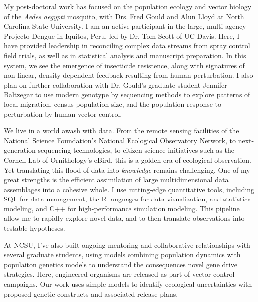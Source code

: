 \documentclass[12pt]{article}
\begin{document}
My post-doctoral work has focused on the 
population ecology and vector biology of the 
{\em Aedes aegypti} mosquito,
with Drs. Fred Gould and Alun Lloyd at 
North Carolina State University. I am an
active participant in the large, multi-agency
Projecto Dengue in Iquitos, Peru, led by Dr.
Tom Scott of UC Davis. Here, I 
have provided leadership in reconciling complex data 
streams from spray control field trials, as well as
in statistical analysis and manuscript preparation.
In this system, we see the emergence 
of insecticide resistence, along with signatures of  
non-linear, density-dependent feedback resulting 
from human perturbation. I also plan on further  
collaboration with Dr. Gould's graduate student 
Jennifer Baltzegar to use modern genotype by 
sequencing methods to explore patterns of local 
migration, census population size, and the 
population response to perturbation by human 
vector control. 

We live in a world awash with data. From the remote sensing 
facilities of the National Science Foundation's National 
Ecological Observatory Network, to next-generation 
sequencing technologies, to citizen science initiatives 
such as the Cornell Lab of Ornithology's eBird,
this is a golden era of ecological observation. 
Yet translating this flood of data into {\em knowledge} 
remains challenging.  One of my great strengths is the
efficient assimilation of large multidimensional data 
assemblages into a cohesive whole. 
I use cutting-edge quantitative tools, including 
SQL for data management, the R languages for data visualization,
and statistical modeling, and C++ for high-performance simulation
modeling. This pipeline allow me to rapidly explore novel data,
and to then translate observations into testable hypotheses.


At NCSU, I've also built ongoing mentoring and 
collaborative relationships with several graduate students,
using models combining population dynamics with 
populaiton genetics models to 
understand the consequences novel gene drive strategies. 
Here, engineered organisms are released as part of vector 
control campaigns. Our work uses simple models to identify
ecological uncertainties with proposed genetic constructs
and associated release plans.



\end{document}
